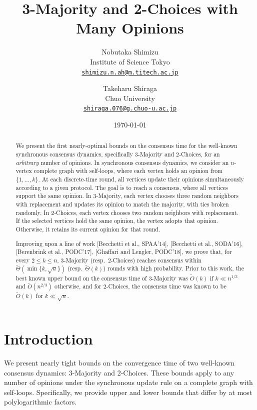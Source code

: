 \documentclass[letterpaper,11pt]{article}
\title{3-Majority and 2-Choices with Many Opinions}
\author{
    Nobutaka Shimizu\\
    \small{Institute of Science Tokyo}\\
    \small{\texttt{\href{shimizu.n.ah@m.titech.ac.jp}{shimizu.n.ah@m.titech.ac.jp}}}
   \and
    Takeharu Shiraga\\
    \small{Chuo University}\\
   \small{\texttt{\href{shiraga.076@g.chuo-u.ac.jp}{shiraga.076@g.chuo-u.ac.jp}}}
}
\date{\today}
\begin{document}
\maketitle


\begin{abstract}
  We present the first nearly‑optimal bounds on the consensus time for the well‑known synchronous consensus dynamics, specifically 3‑Majority and 2‑Choices, for an \emph{arbitrary} number of opinions. 
  In synchronous consensus dynamics, we consider an $n$-vertex complete graph with self‑loops, where each vertex holds an opinion from $\{1,\dots,k\}$.
  At each discrete-time round, all vertices update their opinions simultaneously according to a given protocol. 
  The goal is to reach a consensus, where all vertices support the same opinion.
  In 3-Majority, each vertex chooses three random neighbors with replacement and updates its opinion to match the majority, with ties broken randomly.
  In 2‑Choices, each vertex chooses two random neighbors with replacement. 
  If the selected vertices hold the same opinion, the vertex adopts that opinion. 
  Otherwise, it retains its current opinion for that round.

  Improving upon a line of work [Becchetti et al., SPAA'14], [Becchetti et al., SODA'16], [Berenbrink et al., PODC'17], [Ghaffari and Lengler, PODC'18], we prove that, for every $2\le k \le n$, 
  3-Majority (resp.\ 2-Choices) reaches consensus within $\widetilde{\Theta}(\min\{k,\sqrt{n}\})$ (resp.\ $\widetilde{\Theta}(k)$) rounds with high probability. 
  Prior to this work, the best known upper bound on the consensus time of 3-Majority was $\widetilde{O}(k)$ if $k \ll n^{1/3}$ and $\widetilde{O}(n^{2/3})$ otherwise, and for 2-Choices, the consensus time was known to be $\widetilde{O}(k)$ for $k\ll \sqrt{n}$.
\end{abstract}

\tableofcontents
\section{Introduction}
We present nearly tight bounds on the convergence time of two well-known consensus dynamics: 3-Majority and 2-Choices. These bounds apply to any number of opinions under the synchronous update rule on a complete graph with self-loops. Specifically, we provide upper and lower bounds that differ by at most polylogarithmic factors.
\end{document}
